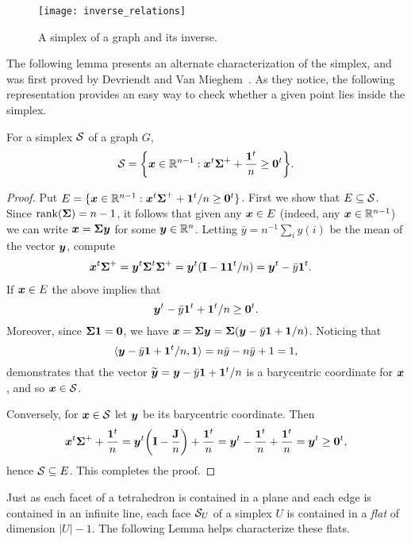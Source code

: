 \begin{figure}
	\centering
	\texttt{[image: inverse\_relations]}
	\caption{A simplex of a graph and its inverse. }
	\label{fig:inverse_relations}
\end{figure}


The following lemma presents an alternate characterization of the simplex, and was first proved by Devriendt  and Van Mieghem~\cite{devriendt2018simplex}. As they notice, the following representation provides an easy way to check whether a given point lies inside the simplex. 

\begin{lemma}
\label{lem:S_alt_desc}
For a simplex $\mathcal{S}$ of a graph $G$, 
\begin{equation}
\label{eq:S_alt_desc}
    \mathcal{S}=\bigg\{\vb*{x}\in \mathbb{R}^{n-1}:\vb*{x}^t\boldsymbol{\Sigma}^++\frac{\vb{1}^t}{n}\geq \vb{0}^t\bigg\}.
\end{equation}
\end{lemma}
\begin{proof}
Put $E=\{\vb*{x}\in \mathbb{R}^{n-1}:\vb*{x}^t\boldsymbol{\Sigma}^++\vb{1}^t/n\geq \vb{0}^t\}$. First we show that $E\subseteq\mathcal{S}$. 
Since $\rank(\boldsymbol{\Sigma})=n-1$, it follows that given any $\vb*{x}\in E$ (indeed, any $\vb*{x}\in\mathbb{R}^{n-1}$) we can write $\vb*{x}=\boldsymbol{\Sigma}\vb*{y}$ for some $\vb*{y}\in\mathbb{R}^n$. Letting $\bar{y}=n^{-1}\sum_i y(i)$ be the mean of the vector $\vb*{y}$, compute
\begin{align*}
    \vb*{x}^t\boldsymbol{\Sigma}^+ &= \vb*{y}^t \boldsymbol{\Sigma}^t\boldsymbol{\Sigma}^+ = \vb*{y}^t(\vb{I}-\vb{1}\vb{1}^t/n)=\vb*{y}^t - \bar{y}\vb{1}^t.
\end{align*}
If $\vb*{x}\in E$ the above implies that 
\[\vb*{y}^t-\bar{y}\vb{1}^t + \vb{1}^t/n\geq \vb{0}^t.\]
Moreover, since $\boldsymbol{\Sigma}\vb{1}=\vb{0}$, we have $\vb*{x}=\boldsymbol{\Sigma}\vb*{y}=\boldsymbol{\Sigma}(\vb*{y}-\bar{y}\vb{1} +\vb{1}/n)$. Noticing that 
\[\langle \vb*{y}-\bar{y}\vb{1}+\vb{1}^t/n,\vb{1}\rangle = n\bar{y}-n\bar{y}+1=1,\]
demonstrates that the vector $\widetilde{\vb*{y}}=\vb*{y}-\bar{y}\vb{1}+\vb{1}^t/n$ is a barycentric coordinate for $\vb*{x}$, and so $\vb*{x}\in \mathcal{S}$. 

Conversely, for $\vb*{x}\in\mathcal{S}$ let $\vb*{y}$ be its barycentric coordinate. Then 
\[\vb*{x}^t\boldsymbol{\Sigma}^++\frac{\vb{1}^t}{n}=\vb*{y}^t\bigg(\vb{I}-\frac{\vb{J}}{n}\bigg)+\frac{\vb{1}^t}{n}=\vb*{y}^t - \frac{\vb{1}^t}{n}+\frac{\vb{1}^t}{n}=\vb*{y}^t\geq \vb{0}^t, \]
hence $\mathcal{S}\subseteq E$. This completes the proof. 
 \end{proof}

Just as each facet of a tetrahedron is contained in a plane and each edge is contained in an infinite line, each face $\mathcal{S}_U$ of a simplex $U$ is contained in a \emph{flat} of dimension $|U|-1$. The following Lemma helps characterize these flats. 


